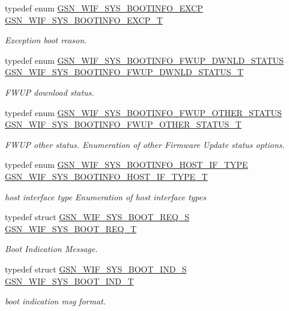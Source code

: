 \begin{DoxyCompactItemize}
typedef enum \hyperlink{a00639_ga9447df4a60ba9be14d372720213b2c23}{GSN\_\-WIF\_\-SYS\_\-BOOTINFO\_\-EXCP} \hyperlink{a00639_ga908aa6facf38cbcd28fae2a91d83d4e7}{GSN\_\-WIF\_\-SYS\_\-BOOTINFO\_\-EXCP\_\-T}
\begin{DoxyCompactList}\small\item\em Exception boot reason. \end{DoxyCompactList}\item 
typedef enum \hyperlink{a00639_ga39cb2f02fc6abae8ae5a431aa24944c0}{GSN\_\-WIF\_\-SYS\_\-BOOTINFO\_\-FWUP\_\-DWNLD\_\-STATUS} \hyperlink{a00639_ga0a757a76eb611c307f5c94e57d0a462a}{GSN\_\-WIF\_\-SYS\_\-BOOTINFO\_\-FWUP\_\-DWNLD\_\-STATUS\_\-T}
\begin{DoxyCompactList}\small\item\em FWUP download status. \end{DoxyCompactList}\item 
typedef enum \hyperlink{a00639_ga8df4566faa9edce0748124e2d08c1efe}{GSN\_\-WIF\_\-SYS\_\-BOOTINFO\_\-FWUP\_\-OTHER\_\-STATUS} \hyperlink{a00639_ga48fd5cab26a503fd58913132ff62487b}{GSN\_\-WIF\_\-SYS\_\-BOOTINFO\_\-FWUP\_\-OTHER\_\-STATUS\_\-T}
\begin{DoxyCompactList}\small\item\em FWUP other status. Enumeration of other Firmware Update status options. \end{DoxyCompactList}\item 
typedef enum \hyperlink{a00639_gaa1aae8d2007a2f4b746672dbc9c8efbb}{GSN\_\-WIF\_\-SYS\_\-BOOTINFO\_\-HOST\_\-IF\_\-TYPE} \hyperlink{a00639_gaa8a4795d26e385102aa6e91b2a088c6d}{GSN\_\-WIF\_\-SYS\_\-BOOTINFO\_\-HOST\_\-IF\_\-TYPE\_\-T}
\begin{DoxyCompactList}\small\item\em host interface type Enumeration of host interface types \end{DoxyCompactList}\item 
typedef struct \hyperlink{a00348}{GSN\_\-WIF\_\-SYS\_\-BOOT\_\-REQ\_\-S} \hyperlink{a00639_ga1d3de3e01c42d56351a808bbea56786d}{GSN\_\-WIF\_\-SYS\_\-BOOT\_\-REQ\_\-T}
\begin{DoxyCompactList}\small\item\em Boot Indication Message. \end{DoxyCompactList}\item 
typedef struct \hyperlink{a00347}{GSN\_\-WIF\_\-SYS\_\-BOOT\_\-IND\_\-S} \hyperlink{a00639_gad38929b3e09d60d08210d2b83a89b43f}{GSN\_\-WIF\_\-SYS\_\-BOOT\_\-IND\_\-T}
\begin{DoxyCompactList}\small\item\em boot indication msg format. \end{DoxyCompactList}\item 

\end{DoxyCompactItemize}
